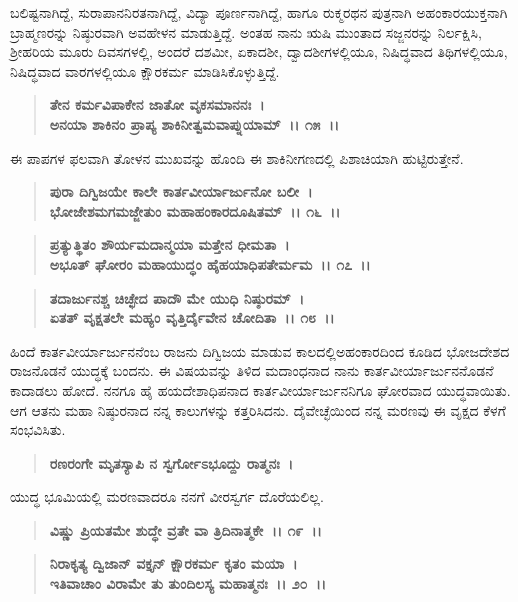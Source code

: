ಬಲಿಷ್ಟನಾಗಿದ್ದೆ, ಸುರಾಪಾನನಿರತನಾಗಿದ್ದೆ, ವಿದ್ಯಾ ಪೂರ್ಣನಾಗಿದ್ದೆ, ಹಾಗೂ ರುಕ್ಮರಥನ ಪುತ್ರನಾಗಿ ಅಹಂಕಾರಯುಕ್ತನಾಗಿ ಬ್ರಾಹ್ಮಣರನ್ನು ನಿಷ್ಠುರವಾಗಿ ಅವಹೇಳನ ಮಾಡುತ್ತಿದ್ದೆ. ಅಂತಹ ನಾನು ಋಷಿ ಮುಂತಾದ ಸಜ್ಜನರನ್ನು ನಿರ್ಲಕ್ಷಿಸಿ, ಶ‍್ರೀಹರಿಯ ಮೂರು ದಿವಸಗಳಲ್ಲಿ, ಅಂದರೆ ದಶಮೀ, ಏಕಾದಶೀ, ದ್ವಾದಶೀಗಳಲ್ಲಿಯೂ, ನಿಷಿದ್ಧವಾದ ತಿಥಿಗಳಲ್ಲಿಯೂ, ನಿಷಿದ್ಧವಾದ ವಾರಗಳಲ್ಲಿಯೂ ಕ್ಷೌರಕರ್ಮ ಮಾಡಿಸಿಕೊಳ್ಳುತ್ತಿದ್ದೆ.

\begin{verse}
\textbf{ತೇನ ಕರ್ಮವಿಪಾಕೇನ ಜಾತೋ ವೃಕಸಮಾನನಃ~।}\\\textbf{ಅನಯಾ ಶಾಕಿನಂ ಪ್ರಾಪ್ಯ ಶಾಕಿನೀತ್ವಮವಾಪ್ನುಯಾಮ್~।। ೧೫~।।} 
\end{verse}

ಈ ಪಾಪಗಳ ಫಲವಾಗಿ ತೋಳನ ಮುಖವನ್ನು ಹೊಂದಿ ಈ ಶಾಕಿನೀಗಣದಲ್ಲಿ ಪಿಶಾಚಿಯಾಗಿ ಹುಟ್ಟಿರುತ್ತೇನೆ.

\begin{verse}
\textbf{ಪುರಾ ದಿಗ್ವಿಜಯೇ ಕಾಲೇ ಕಾರ್ತವೀರ್ಯಾರ್ಜುನೋ ಬಲೀ~।}\\\textbf{ಭೋಜೇಶಮಗಮಜ್ಜೇತುಂ ಮಹಾಹಂಕಾರದೂಷಿತಮ್~।। ೧೬~।।} 
\end{verse}

\begin{verse}
\textbf{ಪ್ರತ್ಯುತ್ಥಿತಂ ಶೌರ್ಯಮದಾನ್ಮಯಾ ಮತ್ತೇನ ಧೀಮತಾ~।}\\\textbf{ಅಭೂತ್ ಘೋರಂ ಮಹಾಯುದ್ಧಂ ಹೈಹಯಾಧಿಪತೇರ್ಮಮ~।। ೧೭~।।} 
\end{verse}

\begin{verse}
\textbf{ತದಾರ್ಜುನಶ್ಚ ಚಿಚ್ಛೇದ ಪಾದೌ ಮೇ ಯುಧಿ ನಿಷ್ಠುರಮ್~।}\\\textbf{ಏತತ್ ವೃಕ್ಷತಲೇ ಮಹ್ಯಂ ವೃತ್ತಿರ್ದೈವೇನ ಚೋದಿತಾ~।। ೧೮~।। }
\end{verse}

ಹಿಂದೆ ಕಾರ್ತವೀರ್ಯಾರ್ಜುನನೆಂಬ ರಾಜನು ದಿಗ್ವಿಜಯ ಮಾಡುವ ಕಾಲದಲ್ಲಿ\break ಅಹಂಕಾರದಿಂದ ಕೂಡಿದ ಭೋಜದೇಶದ ರಾಜನೊಡನೆ ಯುದ್ಧಕ್ಕೆ ಬಂದನು. ಈ ವಿಷಯವನ್ನು ತಿಳಿದ ಮದಾಂಧನಾದ ನಾನು ಕಾರ್ತವೀರ್ಯಾರ್ಜುನನೊಡನೆ ಕಾದಾಡಲು ಹೋದೆ. ನನಗೂ ಹೈ ಹಯದೇಶಾಧಿಪನಾದ ಕಾರ್ತವೀರ್ಯಾರ್ಜುನನಿಗೂ ಘೋರವಾದ ಯುದ್ಧ\-ವಾಯಿತು. ಆಗ ಆತನು ಮಹಾ ನಿಷ್ಠುರನಾದ ನನ್ನ ಕಾಲುಗಳನ್ನು ಕತ್ತರಿಸಿದನು. ದೈವೇಚ್ಛೆಯಿಂದ ನನ್ನ ಮರಣವು ಈ ವೃಕ್ಷದ ಕೆಳಗೆ ಸಂಭವಿಸಿತು.

\begin{verse}
\textbf{ರಣರಂಗೇ ಮೃತಸ್ಯಾಪಿ ನ ಸ್ವರ್ಗೋಽಭೂದ್ದು ರಾತ್ಮನಃ~।}
\end{verse}

ಯುದ್ಧ ಭೂಮಿಯಲ್ಲಿ ಮರಣವಾದರೂ ನನಗೆ ವೀರಸ್ವರ್ಗ ದೊರೆಯಲಿಲ್ಲ.

\begin{verse}
\textbf{ವಿಷ್ಣು ಪ್ರಿಯತಮೇ ಶುದ್ಧೇ ವ್ರತೇ ವಾ ತ್ರಿದಿನಾತ್ಮಕೇ~।। ೧೯~।।} 
\end{verse}

\begin{verse}
\textbf{ನಿರಾಕೃತ್ಯ ದ್ವಿಜಾನ್ ವಕ್ತೃನ್ ಕ್ಷೌರಕರ್ಮ ಕೃತಂ ಮಯಾ~।}\\\textbf{ಇತಿವಾಚಾಂ ವಿರಾಮೇ ತು ತುಂದಿಲಸ್ಯ ಮಹಾತ್ಮನಃ~।। ೨೦~।। }
\end{verse}

